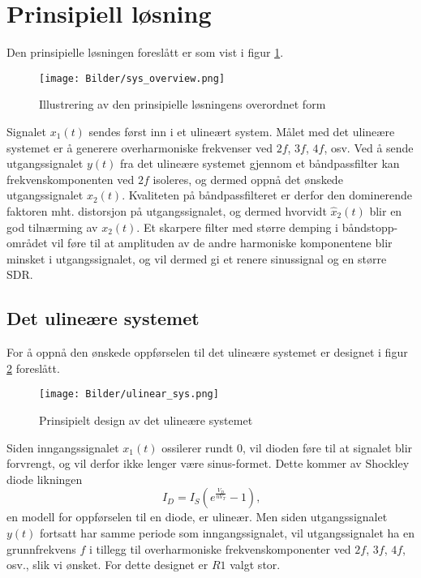 \section{Prinsipiell løsning}
\label{prinsipiellLoesning}

Den prinsipielle løsningen foreslått er som vist i figur \ref{fig:prinsip_sys}.

\begin{figure}[H]
    \centering
    \texttt{[image: Bilder/sys\_overview.png]}
    \caption{Illustrering av den prinsipielle løsningens overordnet form}
    \label{fig:prinsip_sys}
\end{figure}

Signalet $x_1(t)$ sendes først inn i et ulineært system. Målet med det ulineære systemet 
er å generere overharmoniske frekvenser ved $2f$, $3f$, $4f$, osv. Ved å sende utgangssignalet 
$y(t)$ fra det ulineære systemet gjennom et båndpassfilter kan frekvenskomponenten ved $2f$ isoleres,
og dermed oppnå det ønskede utgangssignalet $x_2(t)$. Kvaliteten på båndpassfilteret er derfor den 
dominerende faktoren mht. distorsjon på utgangssignalet, og dermed hvorvidt $\hat{x}_2(t)$ blir en god
tilnærming av $x_2(t)$.
Et skarpere filter med større demping i båndstopp-området vil føre til at amplituden av de andre harmoniske komponentene 
blir minsket i utgangssignalet, og vil dermed gi et renere sinussignal og en større SDR.

\subsection{Det ulineære systemet}
For å oppnå den ønskede oppførselen til det ulineære systemet er designet i figur \ref{fig:ulin_sys} foreslått.

\begin{figure}[H]
    \centering
    \texttt{[image: Bilder/ulinear\_sys.png]}
    \caption{Prinsipielt design av det ulineære systemet}
    \label{fig:ulin_sys}
\end{figure}

Siden inngangssignalet $x_1(t)$ ossilerer rundt 0, vil dioden føre til at signalet blir forvrengt, og vil derfor ikke 
lenger være sinus-formet. Dette kommer av Shockley diode likningen \cite{shockley}
\[
    I_D = I_S\left(e^{\frac{V_D}{n V_T}} - 1\right)\text{,}
\]
en modell for oppførselen til en diode, er ulineær.
Men siden utgangssignalet $y(t)$ fortsatt har samme periode som inngangssignalet,
vil utgangssignalet ha en grunnfrekvens $f$ i tillegg til overharmoniske frekvenskomponenter ved $2f$, $3f$, $4f$, osv., 
slik vi ønsket. For dette designet er $R1$ valgt stor.

